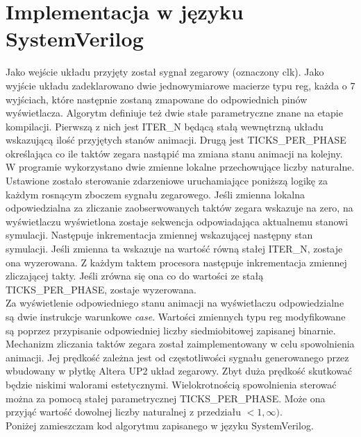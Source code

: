 \documentclass{article}
\begin{document}
    \section{Implementacja w języku SystemVerilog}
        Jako wejście układu przyjęty został sygnał zegarowy (oznaczony clk). Jako wyjście układu zadeklarowano dwie jednowymiarowe macierze typu reg, każda o 7 wyjściach, które następnie zostaną zmapowane do odpowiednich pinów wyświetlacza. Algorytm definiuje też dwie stałe parametryczne znane na etapie kompilacji. Pierwszą z nich jest ITER\_N będącą stałą wewnętrzną układu wskazującą ilość przyjętych stanów animacji. Drugą jest TICKS\_PER\_PHASE określająca co ile taktów zegara nastąpić ma zmiana stanu animacji na kolejny. W programie wykorzystano dwie zmienne lokalne przechowujące liczby naturalne.\\
        
        Ustawione zostało sterowanie zdarzeniowe uruchamiające poniższą logikę za każdym rosnącym zboczem sygnału zegarowego. Jeśli zmienna lokalna odpowiedzialna za zliczanie zaobserwowanych taktów zegara wskazuje na zero, na wyświetlaczu wyświetlona zostaje sekwencja odpowiadająca aktualnemu stanowi symulacji. Następuje inkrementacja zmiennej wskazującej następny stan symulacji. Jeśli zmienna ta wskazuje na wartość równą stałej ITER\_N, zostaje ona wyzerowana. Z każdym taktem procesora następuje inkrementacja zmiennej zliczającej takty. Jeśli zrówna się ona co do wartości ze stałą TICKS\_PER\_PHASE, zostaje wyzerowana.\\
        
        Za wyświetlenie odpowiedniego stanu animacji na wyświetlaczu odpowiedzialne są dwie instrukcje warunkowe \textit{case}. Wartości zmiennych typu reg modyfikowane są poprzez przypisanie odpowiedniej liczby siedmiobitowej zapisanej binarnie.\\
        
        Mechanizm zliczania taktów zegara został zaimplementowany w celu spowolnienia animacji. Jej prędkość zależna jest od częstotliwości sygnału generowanego przez wbudowany w płytkę Altera UP2 układ zegarowy. Zbyt duża prędkość skutkować będzie niskimi walorami estetycznymi. Wielokrotnością spowolnienia sterować można za pomocą stałej parametrycznej TICKS\_PER\_PHASE. Może ona przyjąć wartość dowolnej liczby naturalnej z przedziału $<1,\infty)$.\\
        
        Poniżej zamieszczam kod algorytmu zapisanego w języku SystemVerilog.
        
\end{document}
